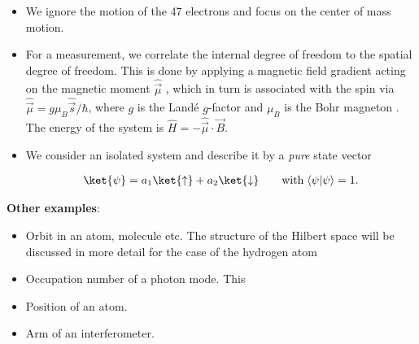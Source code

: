 \begin{itemize}
						\item 	We ignore the motion of the 47 electrons and focus on the center of mass motion.
						\item 	For a measurement, we correlate the internal degree of freedom to the spatial degree of freedom. This is done by applying a magnetic field gradient acting on the magnetic moment $\hat{\vec{\mu}}$ , which in turn is associated with the spin via $\hat{\vec{\mu}} = g \mu_B \hat{\vec{s}}/\hbar$, where $g$ is the Landé $g$-factor  and $\mu_B$ is the Bohr magneton . The energy of the system is $\hat{H} = -\hat{\vec{\mu}} \cdot \vec{B}$.
						\item 	We consider an isolated system and describe it by a \emph{pure} state vector

\begin{align}
	\ket{\psi} = a_1 \ket{\uparrow} + a_2 \ket{\downarrow}  \qquad \text{with} \; \langle\psi | \psi\rangle = 1.
\end{align}
\end{itemize}
\textbf{Other examples}:
\begin{itemize}
\item Orbit in an atom, molecule etc. The structure of the Hilbert space will be discussed in more detail for the case of the hydrogen atom
\item Occupation number of a photon mode. This 
\item Position of an atom.
\item Arm of an interferometer.
\end{itemize}
